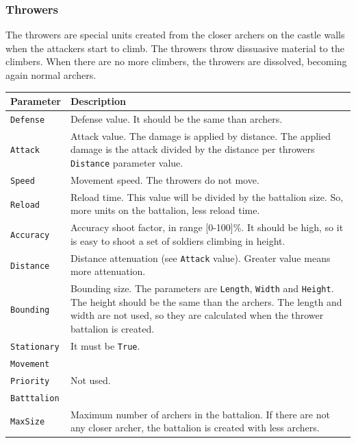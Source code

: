\documentclass[tog]{acmsiggraph}
\begin{document}
\subsubsection{Throwers}
\label{sec:settingsthrowers}

The throwers are special units created from the closer archers on the castle walls when the attackers start to climb.
The throwers throw dissuasive material to the climbers.
When there are no more climbers, the throwers are dissolved, becoming again normal archers.

\begin{tabularx}{0.48\textwidth}{ |X|X| }
\hline 
\textbf{Parameter} & \textbf{Description} \\[0.15cm]
 \hline
 \texttt{Defense} & Defense value. It should be the same than archers. \\
 \hline
 \texttt{Attack} & Attack value. The damage is applied by distance. The applied damage is the attack divided by the distance per throwers \texttt{Distance} parameter value. \\
 \hline
 \texttt{Speed} & Movement speed. The throwers do not move. \\
 \hline 
 \texttt{Reload} & Reload time. This value will be divided by the battalion size. So, more units on the battalion, less reload time. \\
 \hline 
 \texttt{Accuracy} & Accuracy shoot factor, in range [0-100]\%.  It should be high, so it is easy to shoot a set of soldiers climbing in height. \\
 \hline 
 \texttt{Distance} & Distance attenuation (see \texttt{Attack} value). Greater value means more attenuation. \\
 \hline 
 \texttt{Bounding} & Bounding size. The parameters are \texttt{Length}, \texttt{Width} and \texttt{Height}. The height should be the same than the archers. The length and width are not used, so they are calculated when the thrower battalion is created.\\
 \hline 
 \texttt{Stationary} & It must be \texttt{True}. \\
 \hline 
 \texttt{Movement} & \\
 \texttt{Priority} & Not used. \\
 \hline
 \texttt{Batttalion} & \\
 \texttt{MaxSize} & Maximum number of archers in the battalion. If there are not any closer archer, the battalion is created with less archers. \\
 \hline
\end{tabularx}
\end{document}
